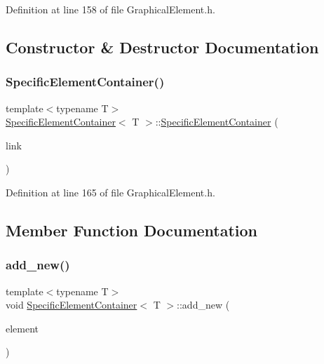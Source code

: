 Definition at line 158 of file Graphical\+Element.\+h.



\subsection{Constructor \& Destructor Documentation}
\mbox{\label{class_specific_element_container_a3455c240bf203136bf88cfbb56d5ed2c}} 
\subsubsection{\texorpdfstring{Specific\+Element\+Container()}{SpecificElementContainer()}}
{\footnotesize\ttfamily template$<$typename T$>$ \\
\hyperlink{class_specific_element_container}{Specific\+Element\+Container}$<$ T $>$\+::\hyperlink{class_specific_element_container}{Specific\+Element\+Container} (\begin{DoxyParamCaption}\item[{\hyperlink{class_element_list}{Element\+List} $\ast$const \&}]{link }\end{DoxyParamCaption})\hspace{0.3cm}{\ttfamily [inline]}}



Definition at line 165 of file Graphical\+Element.\+h.



\subsection{Member Function Documentation}
\mbox{\label{class_specific_element_container_a6a3c2ba0b46445d1504489d5c2ef3530}} 
\subsubsection{\texorpdfstring{add\+\_\+new()}{add\_new()}}
{\footnotesize\ttfamily template$<$typename T$>$ \\
void \hyperlink{class_specific_element_container}{Specific\+Element\+Container}$<$ T $>$\+::add\+\_\+new (\begin{DoxyParamCaption}\item[{T $\ast$}]{element }\end{DoxyParamCaption})\hspace{0.3cm}{\ttfamily [inline]}}



